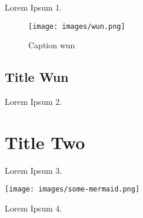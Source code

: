 Lorem Ipsum 1.

\begin{figure}
\centering
\texttt{[image: images/wun.png]}
\caption{Caption wun}
\end{figure}

\newpage

\hypertarget{title-wun}{%
\subsection{Title Wun}\label{title-wun}}

Lorem Ipsum 2.

\hypertarget{title-two}{%
\section{Title Two}\label{title-two}}

Lorem Ipsum 3.


\texttt{[image: images/some-mermaid.png]}

\newpage

Lorem Ipsum 4.
